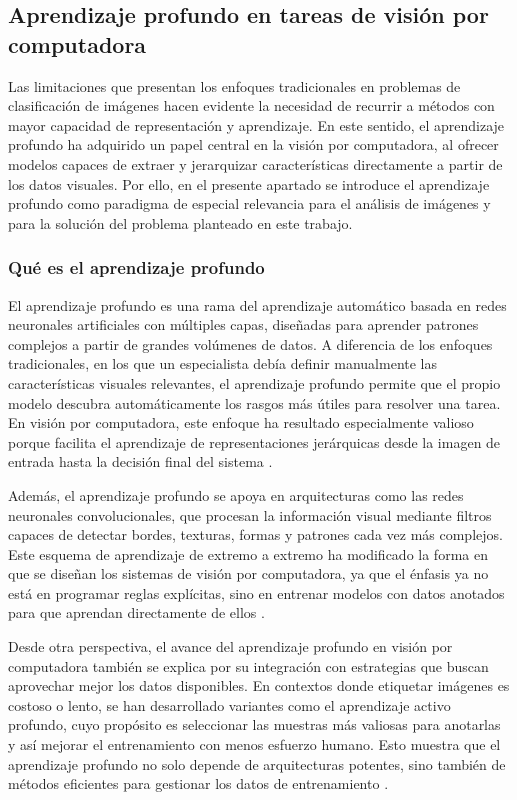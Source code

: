 \subsection{Aprendizaje profundo en tareas de visión por computadora}

Las limitaciones que presentan los enfoques tradicionales en problemas de clasificación de imágenes hacen evidente la necesidad de recurrir a métodos con mayor capacidad de representación y aprendizaje. En este sentido, el aprendizaje profundo ha adquirido un papel central en la visión por computadora, al ofrecer modelos capaces de extraer y jerarquizar características directamente a partir de los datos visuales. Por ello, en el presente apartado se introduce el aprendizaje profundo como paradigma de especial relevancia para el análisis de imágenes y para la solución del problema planteado en este trabajo.

\subsubsection{Qué es el aprendizaje profundo}

El aprendizaje profundo es una rama del aprendizaje automático basada en redes neuronales artificiales con múltiples capas, diseñadas para aprender patrones complejos a partir de grandes volúmenes de datos. A diferencia de los enfoques tradicionales, en los que un especialista debía definir manualmente las características visuales relevantes, el aprendizaje profundo permite que el propio modelo descubra automáticamente los rasgos más útiles para resolver una tarea. En visión por computadora, este enfoque ha resultado especialmente valioso porque facilita el aprendizaje de representaciones jerárquicas desde la imagen de entrada hasta la decisión final del sistema \cite{omahony2019deep_learning_vs_traditional_cv}.

Además, el aprendizaje profundo se apoya en arquitecturas como las redes neuronales convolucionales, que procesan la información visual mediante filtros capaces de detectar bordes, texturas, formas y patrones cada vez más complejos. Este esquema de aprendizaje de extremo a extremo ha modificado la forma en que se diseñan los sistemas de visión por computadora, ya que el énfasis ya no está en programar reglas explícitas, sino en entrenar modelos con datos anotados para que aprendan directamente de ellos \cite{omahony2019deep_learning_vs_traditional_cv}.

Desde otra perspectiva, el avance del aprendizaje profundo en visión por computadora también se explica por su integración con estrategias que buscan aprovechar mejor los datos disponibles. En contextos donde etiquetar imágenes es costoso o lento, se han desarrollado variantes como el aprendizaje activo profundo, cuyo propósito es seleccionar las muestras más valiosas para anotarlas y así mejorar el entrenamiento con menos esfuerzo humano. Esto muestra que el aprendizaje profundo no solo depende de arquitecturas potentes, sino también de métodos eficientes para gestionar los datos de entrenamiento \cite{wu2022deep_active_learning}.

